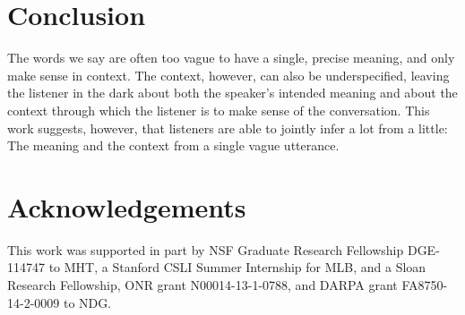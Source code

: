 \documentclass[doc]{apa6}
\begin{document}
\section{Conclusion}

The words we say are often too vague to have a single, precise meaning,
and only make sense in context. The context, however, can also be
underspecified, leaving the listener in the dark about both the
speaker's intended meaning and about the context through which the
listener is to make sense of the conversation. This work suggests,
however, that listeners are able to jointly infer a lot from a little:
The meaning and the context from a single vague utterance.


\section{Acknowledgements}

This work was supported in part by NSF Graduate Research Fellowship
DGE-114747 to MHT, a Stanford CSLI Summer Internship for MLB, and a
Sloan Research Fellowship, ONR grant N00014-13-1-0788, and DARPA grant
FA8750-14-2-0009 to NDG.

\newpage






\end{document}
